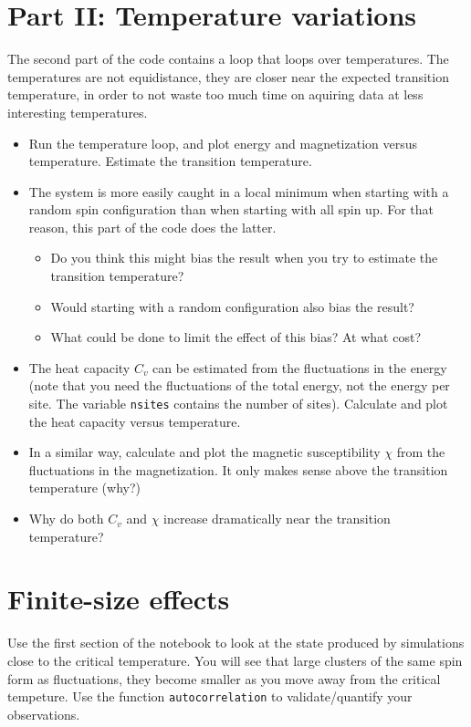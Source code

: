 \documentclass[a4paper,11pt]{article}
\begin{document}
\section{Part II: Temperature variations}

The second part of the code contains a loop that loops over
temperatures.  The temperatures are not equidistance, they are closer
near the expected transition temperature, in order to not waste too
much time on aquiring data at less interesting temperatures.

\begin{itemize}
\item Run the temperature loop, and plot energy and magnetization
  versus temperature.  Estimate the transition temperature.
\item The system is more easily caught in a local minimum when
  starting with a random spin configuration than when starting with
  all spin up.  For that reason, this part of the code does the
  latter.
  \begin{itemize}
  \item Do you think this might bias the result when you try to
    estimate the transition temperature?
  \item Would starting with a random configuration also bias the
    result?
    \item What could be done to limit the effect of this bias?  At
      what cost?
  \end{itemize}
\item The heat capacity $C_v$ can be estimated from the fluctuations
  in the energy (note that you need the fluctuations of the total
  energy, not the energy per site.  The variable \texttt{nsites}
  contains the number of sites).  Calculate and plot the heat capacity
  versus temperature.
\item In a similar way, calculate and plot the magnetic susceptibility
  $\chi$ from the fluctuations in the magnetization.  It only makes
  sense above the transition temperature (why?)
\item Why do both $C_v$ and $\chi$ increase dramatically near the
  transition temperature?
\end{itemize}

\section{Finite-size effects}

Use the first section of the notebook to look at the state produced by
simulations close to the critical temperature.  You will see that
large clusters of the same spin form as fluctuations, they become
smaller as you move away from the critical tempeture. Use the function
\texttt{autocorrelation} to validate/quantify your observations.
\end{document}
